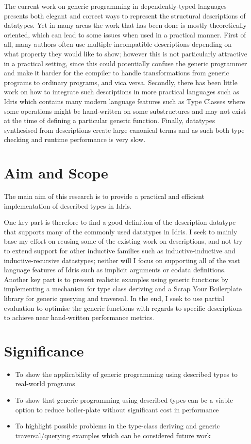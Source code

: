 \documentclass{ituthesis}
\begin{document}
The current work on generic programming in dependently-typed languages presents both elegant and correct ways to represent the structural descriptions of datatypes.
Yet in many areas the work that has been done is mostly theoretically oriented, which can lead to some issues when used in a practical manner.
First of all, many authors often use multiple incompatible descriptions depending on what property they would like to show; however this is not particularly attractive in a practical setting, since this could potentially confuse the generic programmer and make it harder for the compiler
to handle transformations from generic programs to ordinary programs, and vica versa.
Secondly, there has been little work on how to integrate such descriptions in more practical languages such as Idris which contains many modern language features such as Type Classes where some operations might be hand-written on some substructures and may not exist at the time of defining a particular generic function.
Finally, datatypes synthesised from descriptions create large canonical terms and as such both type checking and runtime performance is very slow.

\section{Aim and Scope}
\label{sec:AimandScope}
The main aim of this research is to provide a practical and efficient implementation of described types in Idris.

One key part is therefore to find a good definition of the description datatype that supports many of the commonly used datatypes in Idris.
I seek to mainly base my effort on reusing some of the existing work on descriptions, and not try to extend support for other inductive families such as inductive-inductive and inductive-recursive datastypes; neither will I focus on supporting all of the vast language features of Idris such as implicit arguments or codata definitions.
Another key part is to present realistic examples using generic functions by implementing a mechanism for type class deriving and a Scrap Your Boilerplate library for generic querying and traversal.
In the end, I seek to use partial evaluation to optimise the generic functions with regards to specific descriptions to achieve near hand-written performance metrics.

\section{Significance}
\label{sec:Significance}
\begin{itemize}
  \item To show the applicability of generic programming using described types to real-world programs
  \item To show that generic programming using described types can be a viable option to reduce boiler-plate without significant cost in performance
  \item To highlight possible problems in the type-class deriving and generic traversal/querying examples which can be considered future work
\end{itemize}
\end{document}
